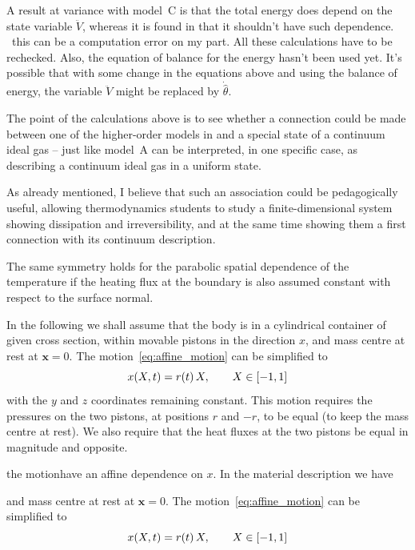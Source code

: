 \documentclass[\ifafour a4paper,12pt,\else a5paper,10pt,\fi%
onecolumn,oneside,article,%
british%
]{memoir}
\theoremstyle{remark}
\theoremstyle{innote}
\DeclarePairedDelimiter\clcl{[}{]}
\renewcommand*{\|}[1][]{\nonscript\,#1\vert\nonscript\;\mathopen{}}
\newcommand*{\wrench}{{\fontencoding{U}\fontfamily{fontawesomethree}\selectfont\symbol{114}}}
\newcommand{\mynote}[1]{ {\color{notecolour}\wrench\ #1}}
\newcommand*{\yr}{r}
\newcommand*{\yt}{\theta}
\newcommand*{\yVb}{V}
\newcommand*{\yVdd}{\ddot{\yVb}}
\newcommand*{\yx}{\bm{x}}
\newcommand*{\ytb}{\hat{\yt}}
\begin{document}
A result at variance with model~C is that the total energy does depend on
the state variable $\yVdd$, whereas it is found in
\citeauthor{pekaretal2014} that it shouldn't have such dependence.
\mynote{this can be a computation error on my part. All these calculations
  have to be rechecked. Also, the equation of balance for the energy hasn't
  been used yet. It's possible that with some change in the equations above
  and using the balance of energy, the variable $\yVdd$ might be replaced by
  $\dot{\ytb}$.}


\bigskip

The point of the calculations above is to see whether a connection could be
made between one of the higher-order models in \citeauthor{pekaretal2014}
and a special state of a continuum ideal gas – just like model~A can be
interpreted, in one specific case, as describing a continuum ideal gas in a
uniform state.

As already mentioned, I believe that such an association could be
pedagogically useful, allowing thermodynamics students to study a
finite-dimensional system showing dissipation and irreversibility, and at
the same time showing them a first connection with its continuum description.


\iffalse
The same symmetry holds for the parabolic
spatial dependence of the temperature if the heating flux at the boundary
is also assumed constant with respect to the surface normal.

In the following we shall assume that the body is in a cylindrical
container of given cross section, within movable pistons in the direction
$x$, and mass centre at rest at $\yx = 0$. The
motion~\eqref{eq:affine_motion} can be simplified to
\begin{equation}
  \label{eq:simplified_affine_motion}
  x(X,t) = \yr(t) \, X, \qquad X \in \clcl{-1, 1}
\end{equation}
with the $y$ and $z$ coordinates remaining constant. This motion requires
the pressures on the two pistons, at positions $\yr$ and $-\yr$, to be
equal (to keep the mass centre at rest). We also require that the heat
fluxes at the two pistons be equal in magnitude and opposite.





the motionhave an affine dependence on $x$. In the
material description we have


and mass centre at rest at $\yx = 0$. The
motion~\eqref{eq:affine_motion} can be simplified to
\begin{equation}
  \label{eq:simplified_affine_motion}
  x(X,t) = \yr(t) \, X, \qquad X \in \clcl{-1, 1}
\end{equation}
\end{document}
